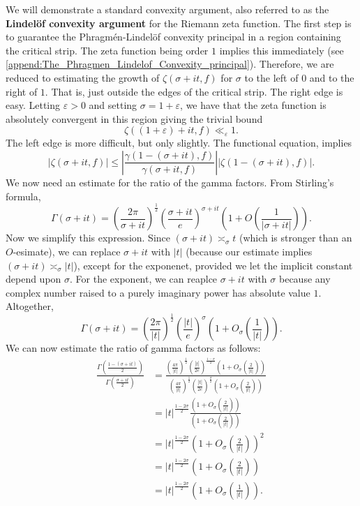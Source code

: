 \documentclass[12pt]{book}
\theoremstyle{definition}\newframedtheorem{method}{Method}
\newcommand{\g}{\gamma}
\newcommand{\z}{\zeta}
\newcommand{\s}{\sigma}
\newcommand{\G}{\Gamma}
\newcommand{\e}{\varepsilon}
\newcommand{\<}{\langle}
\renewcommand{\>}{\rangle}
\begin{document}
    We will demonstrate a standard convexity argument, also referred to as the \textbf{Lindel\"of convexity argument} for the Riemann zeta function. The first step is to guarantee the Phragm\'en-Lindel\"of convexity principal in a region containing the critical strip. The zeta function being order $1$ implies this immediately (see \cref{append:The_Phragmen_Lindelof_Convexity_principal}). Therefore, we are reduced to estimating the growth of $\z(\s+it,f)$ for $\s$ to the left of $0$ and to the right of $1$. That is, just outside the edges of the critical strip. The right edge is easy. Letting $\e > 0$ and setting $\s = 1+\e$, we have that the zeta function is absolutely convergent in this region giving the trivial bound
    \begin{equation}\label{equ:convexity_bound_1}
      \z((1+\e)+it,f) \ll_{\e} 1.
    \end{equation}
    The left edge is more difficult, but only slightly. The functional equation, implies
    \begin{equation}\label{equ:convexity_bound_left_edge}
      |\z(\s+it,f)| \le \left|\frac{\g(1-(\s+it),f)}{\g(\s+it,f)}\right||\z(1-(\s+it),f)|.
    \end{equation}
    We now need an estimate for the ratio of the gamma factors. From Stirling's formula,
    \[
      \G(\s+it) = \left(\frac{2\pi}{\s+it}\right)^{\frac{1}{2}}\left(\frac{\s+it}{e}\right)^{\s+it}\left(1+O\left(\frac{1}{|\s+it|}\right)\right).
    \]
    Now we simplify this expression. Since $(\s+it) \asymp_{\s} t$ (which is stronger than an $O$-esimate), we can replace $\s+it$ with $|t|$ (because our estimate implies $(\s+it) \asymp_{\s} |t|$), except for the exponenet, provided we let the implicit constant depend upon $\s$. For the exponent, we can reaplce $\s+it$ with $\s$ because any complex number raised to a purely imaginary power has absolute value $1$. Altogether,
    \[
      \G(\s+it) = \left(\frac{2\pi}{|t|}\right)^{\frac{1}{2}}\left(\frac{|t|}{e}\right)^{\s}\left(1+O_{\s}\left(\frac{1}{|t|}\right)\right).
    \]
    We can now estimate the ratio of gamma factors as follows:
    \begin{align*}
      \frac{\G\left(\frac{1-(\s+it)}{2}\right)}{\G\left(\frac{\s+it}{2}\right)} &= \frac{\left(\frac{4\pi}{|t|}\right)^{\frac{1}{2}}\left(\frac{|t|}{2e}\right)^{\frac{1-\s}{2}}\left(1+O_{\s}\left(\frac{2}{|t|}\right)\right)}{\left(\frac{4\pi}{|t|}\right)^{\frac{1}{2}}\left(\frac{|t|}{2e}\right)^{\frac{\s}{2}}\left(1+O_{\s}\left(\frac{2}{|t|}\right)\right)} \\
      &= |t|^{\frac{1-2\s}{2}}\frac{\left(1+O_{\s}\left(\frac{2}{|t|}\right)\right)}{\left(1+O_{\s}\left(\frac{2}{|t|}\right)\right)} \\
      &= |t|^{\frac{1-2\s}{2}}\left(1+O_{\s}\left(\frac{2}{|t|}\right)\right)^{2} \\
      &= |t|^{\frac{1-2\s}{2}}\left(1+O_{\s}\left(\frac{2}{|t|}\right)\right) \\
      &= |t|^{\frac{1-2\s}{2}}\left(1+O_{\s}\left(\frac{1}{|t|}\right)\right).
    \end{align*}
\end{document}
